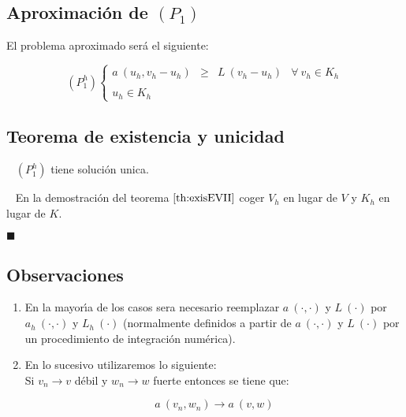 \subsection{Aproximaci\'on de $(P_1)$}

El problema aproximado ser\'a el siguiente:

\begin{equation}
(P^h_1) \left\{ \begin{array}{lrlr} 
a\ (u_h,v_h-u_h)&\ge & L\ (v_h-u_h) & \forall \ v_h \in K_h \\
\\
u_h \in K_h
\end{array} \right.
\end{equation}

\subsection{Teorema de existencia y unicidad}

\begin{teorema}
\ \newline
$(P^h_1)$ tiene soluci\'on unica.
\end{teorema}

\begin{demosteorema}
\ \newline
En la demostraci\'on del teorema $\ref{th:exisEVII}$ coger $V_h$ en lugar de
$V$ y $K_h$ en lugar de $K$.
\begin{flushright}
$\blacksquare$
\end{flushright}

\end{demosteorema}

\newpage

\subsection{Observaciones}

\begin{enumerate}
\item En la mayor\'{\i}a de los casos sera necesario reemplazar
$a\ (\cdot, \cdot)$ y $L\ (\cdot )$ por $a_h\ (\cdot , \cdot )$ y
$L_h\ (\cdot )$ (normalmente definidos a partir de $a\ (\cdot ,\cdot)$ y
$L\ (\cdot )$ por un procedimiento de integraci\'on num\'erica).

\item En lo sucesivo utilizaremos lo siguiente:\\

Si $v_n \to v$ d\'ebil y $w_n  \to w$ fuerte entonces se tiene que:

\begin{displaymath}
a\ (v_n,w_n) \longrightarrow a\ (v,w)
\end{displaymath}

\end{enumerate}

